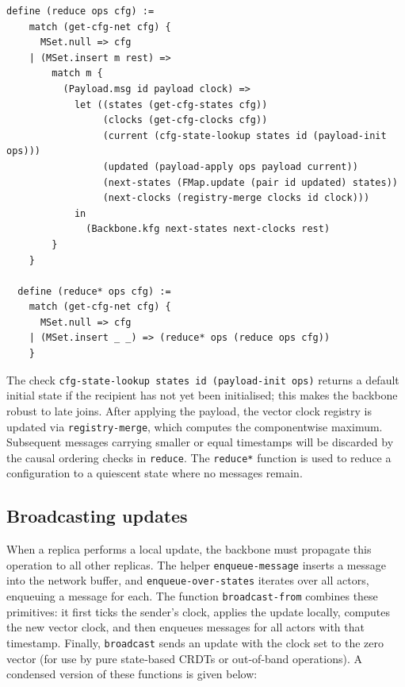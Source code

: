 \begin{lstlisting}[language=Athena,style=athena]
  define (reduce ops cfg) :=
    match (get-cfg-net cfg) {
      MSet.null => cfg
    | (MSet.insert m rest) =>
        match m {
          (Payload.msg id payload clock) =>
            let ((states (get-cfg-states cfg))
                 (clocks (get-cfg-clocks cfg))
                 (current (cfg-state-lookup states id (payload-init ops)))
                 (updated (payload-apply ops payload current))
                 (next-states (FMap.update (pair id updated) states))
                 (next-clocks (registry-merge clocks id clock)))
            in
              (Backbone.kfg next-states next-clocks rest)
        }
    }

  define (reduce* ops cfg) :=
    match (get-cfg-net cfg) {
      MSet.null => cfg
    | (MSet.insert _ _) => (reduce* ops (reduce ops cfg))
    }
\end{lstlisting}

The check \lstinline{cfg-state-lookup states id (payload-init ops)} returns a default initial state if the recipient has not yet been initialised; this makes the backbone robust to late joins.  After applying the payload, the vector clock registry is updated via \lstinline{registry-merge}, which computes the componentwise maximum.  Subsequent messages carrying smaller or equal timestamps will be discarded by the causal ordering checks in \lstinline{reduce}.  The \lstinline{reduce*} function is used to reduce a configuration to a quiescent state where no messages remain.

\subsection{Broadcasting updates}

When a replica performs a local update, the backbone must propagate this operation to all other replicas.  The helper \lstinline{enqueue-message} inserts a message into the network buffer, and \lstinline{enqueue-over-states} iterates over all actors, enqueuing a message for each.  The function \lstinline{broadcast-from} combines these primitives: it first ticks the sender’s clock, applies the update locally, computes the new vector clock, and then enqueues messages for all actors with that timestamp.  Finally, \lstinline{broadcast} sends an update with the clock set to the zero vector (for use by pure state‑based CRDTs or out‑of‑band operations).  A condensed version of these functions is given below:

